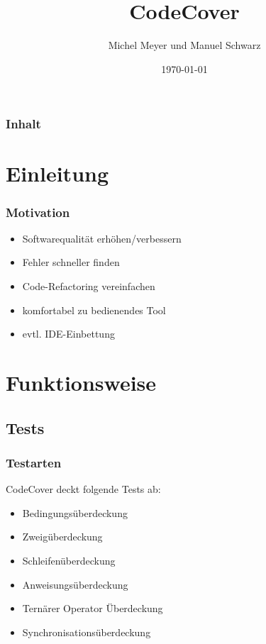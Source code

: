 \documentclass{beamer}
\begin{document}
  \title[CodeCover\hspace{105mm}\insertframenumber/\inserttotalframenumber]{CodeCover}
  \author{Michel Meyer und Manuel Schwarz}
  \date{\today}

  \begin{frame}
    \titlepage
  \end{frame}

  \begin{frame}
    \frametitle{Inhalt}
    \tableofcontents
  \end{frame}


  \section{Einleitung}
  \begin{frame}
    \frametitle{Motivation}
    \begin{itemize}[<+->]
      \item Softwarequalität erhöhen/verbessern
      \item Fehler schneller finden
      \item Code-Refactoring vereinfachen
      \item komfortabel zu bedienendes Tool
      \item evtl. IDE-Einbettung
    \end{itemize}
  \end{frame}

  \section{Funktionsweise}
  \subsection{Tests}
  \begin{frame}\frametitle{Testarten}
  CodeCover deckt folgende Tests ab:
    \begin{itemize}[<+->]
      \item Bedingungsüberdeckung
      \item Zweigüberdeckung
      \item Schleifenüberdeckung
      \item Anweisungsüberdeckung
      \item Ternärer Operator Überdeckung
      \item Synchronisationsüberdeckung
    \end{itemize}
  \end{frame}
\end{document}
